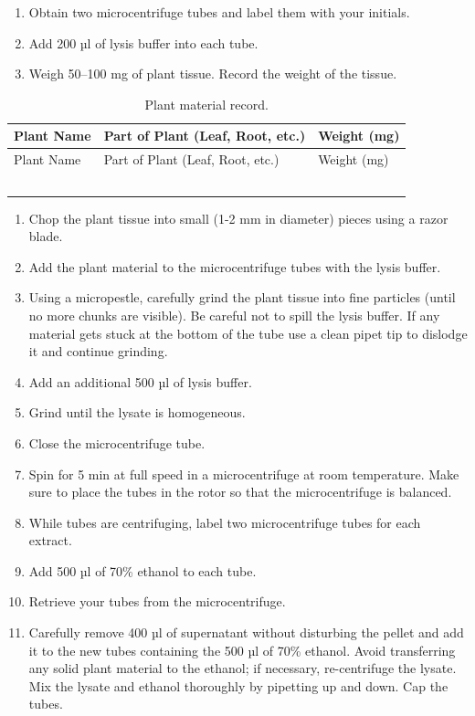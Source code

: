 \documentclass[]{book}
\providecommand{\tightlist}{%
  \setlength{\itemsep}{0pt}\setlength{\parskip}{0pt}}
\theoremstyle{definition}
\theoremstyle{definition}
\theoremstyle{definition}
\theoremstyle{remark}
\begin{document}
\begin{enumerate}
\def\labelenumi{\arabic{enumi}.}
\tightlist
\item
  Obtain two microcentrifuge tubes and label them with your initials.
\item
  Add 200 µl of lysis buffer into each tube.
\item
  Weigh 50--100 mg of plant tissue. Record the weight of the tissue.
\end{enumerate}

\begin{longtable}[]{@{}lll@{}}
\caption{\label{tab:plant} Plant material record.}\tabularnewline
\toprule
Plant Name & Part of Plant (Leaf, Root, etc.) & Weight
(mg)\tabularnewline
\midrule
\endfirsthead
\toprule
Plant Name & Part of Plant (Leaf, Root, etc.) & Weight
(mg)\tabularnewline
\midrule
\endhead
& &\tabularnewline
& &\tabularnewline
& &\tabularnewline
& &\tabularnewline
& &\tabularnewline
\bottomrule
\end{longtable}

\begin{enumerate}
\def\labelenumi{\arabic{enumi}.}
\setcounter{enumi}{3}
\tightlist
\item
  Chop the plant tissue into small (1-2 mm in diameter) pieces using a
  razor blade.
\item
  Add the plant material to the microcentrifuge tubes with the lysis
  buffer.
\item
  Using a micropestle, carefully grind the plant tissue into fine
  particles (until no more chunks are visible). Be careful not to spill
  the lysis buffer. If any material gets stuck at the bottom of the tube
  use a clean pipet tip to dislodge it and continue grinding.
\item
  Add an additional 500 µl of lysis buffer.
\item
  Grind until the lysate is homogeneous.
\item
  Close the microcentrifuge tube.
\item
  Spin for 5 min at full speed in a microcentrifuge at room temperature.
  Make sure to place the tubes in the rotor so that the microcentrifuge
  is balanced.\\
\item
  While tubes are centrifuging, label two microcentrifuge tubes for each
  extract.
\item
  Add 500 µl of 70\% ethanol to each tube.
\item
  Retrieve your tubes from the microcentrifuge.
\item
  Carefully remove 400 µl of supernatant without disturbing the pellet
  and add it to the new tubes containing the 500 µl of 70\% ethanol.
  Avoid transferring any solid plant material to the ethanol; if
  necessary, re-centrifuge the lysate. Mix the lysate and ethanol
  thoroughly by pipetting up and down. Cap the tubes.
\end{enumerate}
\end{document}
